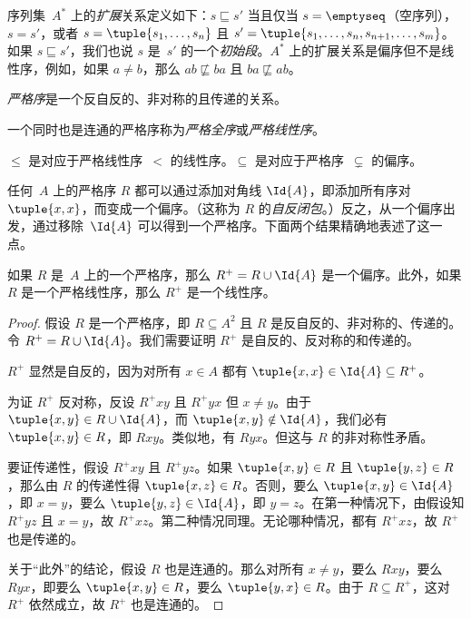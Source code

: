 \documentclass[../../../include/open-logic-section]{subfiles}
\begin{document}
\begin{ex}
序列集~$A^*$ 上的\emph{扩展}关系定义如下：$s \sqsubseteq s'$ 当且仅当 $s = \emptyseq$（空序列），$s = s'$，或者 $s = \tuple{s_1, \dots, s_n}$ 且 $s' =
\tuple{s_1, \dots, s_n, s_{n+1}, \dots, s_m}$。如果 $s \sqsubseteq s'$，我们也说 $s$ 是~$s'$ 的一个\emph{初始段}。$A^*$ 上的扩展关系是偏序但不是线性序，例如，如果 $a \neq b$，那么 $ab \not\sqsubseteq ba$ 且 $ba \not\sqsubseteq ab$。
\end{ex}

\begin{defn}[严格序]
\emph{严格序}是一个反自反的、非对称的且传递的关系。
\end{defn}

\begin{defn}[严格线性序]
一个同时也是连通的严格序称为\emph{严格全序}或\emph{严格线性序}。
\end{defn}

\begin{ex}
$\le$ 是对应于严格线性序~$<$ 的线性序。$\subseteq$ 是对应于严格序~$\subsetneq$ 的偏序。
\end{ex}

任何~$A$ 上的严格序 $R$ 都可以通过添加对角线 $\Id{A}$，即添加所有序对~$\tuple{x, x}$，而变成一个偏序。（这称为 $R$ 的\emph{自反闭包}。）反之，从一个偏序出发，通过移除~$\Id{A}$ 可以得到一个严格序。下面两个结果精确地表述了这一点。

\begin{prop}
如果 $R$ 是~$A$ 上的一个严格序，那么 $R^+ = R \cup \Id{A}$ 是一个偏序。此外，如果 $R$ 是一个严格线性序，那么 $R^+$ 是一个线性序。
\end{prop}

\begin{proof}
假设 $R$ 是一个严格序，即 $R \subseteq A^2$ 且 $R$ 是反自反的、非对称的、传递的。令 $R^+ = R \cup \Id{A}$。我们需要证明 $R^+$ 是自反的、反对称的和传递的。

$R^+$ 显然是自反的，因为对所有 $x \in A$ 都有 $\tuple{x, x} \in \Id{A} \subseteq
R^+$。

为证 $R^+$ 反对称，反设 $R^+xy$ 且 $R^+yx$ 但 $x \neq y$。由于 $\tuple{x,y} \in R \cup \Id{A}$，而 $\tuple{x, y} \notin \Id{A}$，我们必有 $\tuple{x, y} \in R$，即 $Rxy$。类似地，有 $Ryx$。但这与 $R$ 的非对称性矛盾。

要证传递性，假设 $R^+xy$ 且 $R^+yz$。如果 $\tuple{x, y} \in R$ 且 $\tuple{y,z} \in R$，那么由 $R$ 的传递性得 $\tuple{x, z} \in R$。否则，要么 $\tuple{x, y} \in
\Id{A}$，即 $x = y$，要么 $\tuple{y, z} \in \Id{A}$，即 $y = z$。在第一种情况下，由假设知 $R^+yz$ 且 $x = y$，故 $R^+xz$。第二种情况同理。无论哪种情况，都有 $R^+xz$，故 $R^+$ 也是传递的。

关于“此外”的结论，假设 $R$ 也是连通的。那么对所有 $x \neq y$，要么 $Rxy$，要么 $Ryx$，即要么 $\tuple{x, y} \in R$，要么 $\tuple{y, x} \in R$。由于 $R \subseteq R^+$，这对 $R^+$ 依然成立，故 $R^+$ 也是连通的。
\end{proof}
\end{document}
